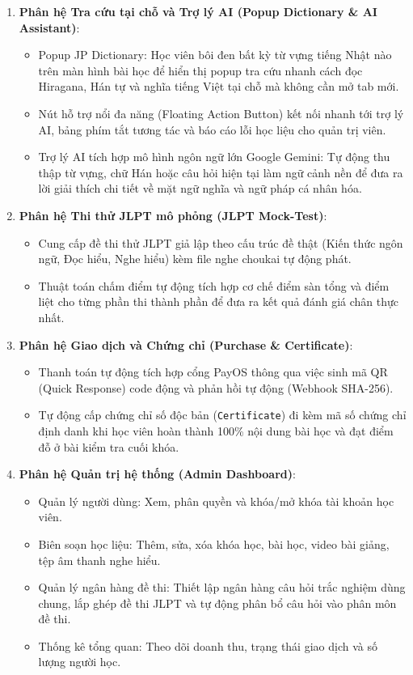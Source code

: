 \documentclass[../DoAn.tex]{subfiles}
\begin{document}
\begin{enumerate}
    \item \textbf{Phân hệ Tra cứu tại chỗ và Trợ lý AI (Popup Dictionary \& AI Assistant)}:
    \begin{itemize}
        \item Popup JP Dictionary: Học viên bôi đen bất kỳ từ vựng tiếng Nhật nào trên màn hình bài học để hiển thị popup tra cứu nhanh cách đọc Hiragana, Hán tự và nghĩa tiếng Việt tại chỗ mà không cần mở tab mới.
        \item Nút hỗ trợ nổi đa năng (Floating Action Button) kết nối nhanh tới trợ lý AI, bảng phím tắt tương tác và báo cáo lỗi học liệu cho quản trị viên.
        \item Trợ lý AI tích hợp mô hình ngôn ngữ lớn Google Gemini: Tự động thu thập từ vựng, chữ Hán hoặc câu hỏi hiện tại làm ngữ cảnh nền để đưa ra lời giải thích chi tiết về mặt ngữ nghĩa và ngữ pháp cá nhân hóa.
    \end{itemize}

    \item \textbf{Phân hệ Thi thử JLPT mô phỏng (JLPT Mock-Test)}:
    \begin{itemize}
        \item Cung cấp đề thi thử JLPT giả lập theo cấu trúc đề thật (Kiến thức ngôn ngữ, Đọc hiểu, Nghe hiểu) kèm file nghe choukai tự động phát.
        \item Thuật toán chấm điểm tự động tích hợp cơ chế điểm sàn tổng và điểm liệt cho từng phần thi thành phần để đưa ra kết quả đánh giá chân thực nhất.
    \end{itemize}

    \item \textbf{Phân hệ Giao dịch và Chứng chỉ (Purchase \& Certificate)}:
    \begin{itemize}
        \item Thanh toán tự động tích hợp cổng PayOS thông qua việc sinh mã QR (Quick Response) code động và phản hồi tự động (Webhook SHA-256).
        \item Tự động cấp chứng chỉ số độc bản (\texttt{Certificate}) đi kèm mã số chứng chỉ định danh khi học viên hoàn thành 100\% nội dung bài học và đạt điểm đỗ ở bài kiểm tra cuối khóa.
    \end{itemize}

    \item \textbf{Phân hệ Quản trị hệ thống (Admin Dashboard)}:
    \begin{itemize}
        \item Quản lý người dùng: Xem, phân quyền và khóa/mở khóa tài khoản học viên.
        \item Biên soạn học liệu: Thêm, sửa, xóa khóa học, bài học, video bài giảng, tệp âm thanh nghe hiểu.
        \item Quản lý ngân hàng đề thi: Thiết lập ngân hàng câu hỏi trắc nghiệm dùng chung, lắp ghép đề thi JLPT và tự động phân bổ câu hỏi vào phân môn đề thi.
        \item Thống kê tổng quan: Theo dõi doanh thu, trạng thái giao dịch và số lượng người học.
    \end{itemize}
\end{enumerate}
\end{document}
